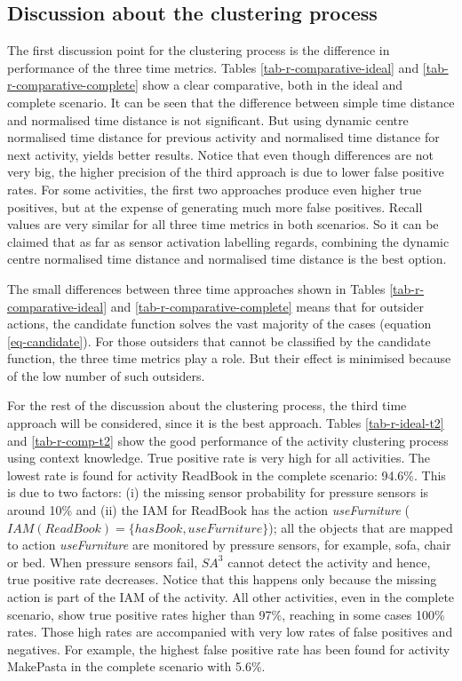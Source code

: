 \subsection{Discussion about the clustering process}

The first discussion point for the clustering process is the difference in performance of the three time metrics. Tables \ref{tab-r-comparative-ideal} and \ref{tab-r-comparative-complete} show a clear comparative, both in the ideal and complete scenario. It can be seen that the difference between simple time distance and normalised time distance is not significant. But using dynamic centre normalised time distance for previous activity and normalised time distance for next activity, yields better results. Notice that even though differences are not very big, the higher precision of the third approach is due to lower false positive rates. For some activities, the first two approaches produce even higher true positives, but at the expense of generating much more false positives. Recall values are very similar for all three time metrics in both scenarios. So it can be claimed that as far as sensor activation labelling regards, combining the dynamic centre normalised time distance and normalised time distance is the best option.

The small differences between three time approaches shown in Tables \ref{tab-r-comparative-ideal} and \ref{tab-r-comparative-complete} means that for outsider actions, the candidate function solves the vast majority of the cases (equation \ref{eq-candidate}). For those outsiders that cannot be classified by the candidate function, the three time metrics play a role. But their effect is minimised because of the low number of such outsiders.

For the rest of the discussion about the clustering process, the third time approach will be considered, since it is the best approach. Tables \ref{tab-r-ideal-t2} and \ref{tab-r-comp-t2} show the good performance of the activity clustering process using context knowledge. True positive rate is very high for all activities. The lowest rate is found for activity ReadBook in the complete scenario: 94.6\%. This is due to two factors: (i) the missing sensor probability for pressure sensors is around 10\% and (ii) the IAM for ReadBook has the action \textit{useFurniture} ($IAM(ReadBook) = \{hasBook, useFurniture\}$); all the objects that are mapped to action \textit{useFurniture} are monitored by pressure sensors, for example, sofa, chair or bed. When pressure sensors fail, $SA^3$ cannot detect the activity and hence, true positive rate decreases. Notice that this happens only because the missing action is part of the IAM of the activity. All other activities, even in the complete scenario, show true positive rates higher than 97\%, reaching in some cases 100\% rates. Those high rates are accompanied with very low rates of false positives and negatives. For example, the highest false positive rate has been found for activity MakePasta in the complete scenario with 5.6\%. 


